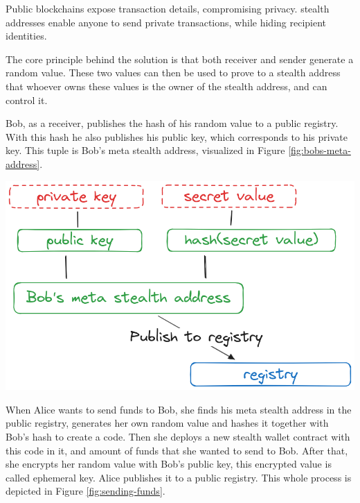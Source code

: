 \documentclass[portrait]{poster}
\begin{document}
\begin{multicols}{2}
    Public blockchains expose transaction details, compromising privacy.
    stealth addresses enable anyone to send private transactions,
    while hiding recipient identities.

    The core principle behind the solution is that both receiver
    and sender generate a random value. These two values can then
    be used to prove to a stealth address that whoever owns these
    values is the owner of the stealth address, and can control it.

    Bob, as a receiver, publishes the hash of his random value to a public
    registry. With this hash he also publishes his public key, which corresponds
    to his private key. This tuple is Bob's meta stealth address, visualized in Figure
    \ref{fig:bobs-meta-address}.

    \begin{center}\vspace{1cm}
        \includegraphics[width=0.5\linewidth]{../iitsrc/assets/images/meta-stealth-address.png}
        \label{fig:bobs-meta-address}
    \end{center}\vspace{1cm}

    When Alice wants to send funds to Bob, she finds his meta stealth address
    in the public registry, generates her own random value and hashes it together
    with Bob's hash to create a code. Then she deploys a new stealth wallet
    contract with this code in it, and amount of funds that she wanted to send
    to Bob. After that, she encrypts her random value with Bob's public key,
    this encrypted value is called ephemeral key. Alice publishes it to a
    public registry. This whole process is depicted in Figure \ref{fig:sending-funds}. 


\end{multicols}
\end{document}
